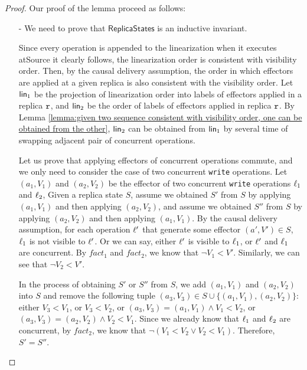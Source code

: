 \begin {proof}
Our proof of the lemma proceed as follows:

\begin{itemize}
\setlength{\itemsep}{0.5pt}
\item[-] We need to prove that $\mathsf{ReplicaStates}$ is an inductive invariant.

Since every operation is appended to the linearization when it executes atSource it clearly follows, the linearization order is consistent with visibility order. Then, by the causal delivery assumption, the order in which effectors are applied at a given replica is also consistent with the visibility order. Let $\mathsf{lin}_1$ be the projection of linearization order into labels of effectors applied in a replica $\mathtt{r}$, and $\mathsf{lin}_2$ be the order of labels of effectors applied in replica $\mathtt{r}$. By Lemma \ref{lemma:given two sequence consistent with visibility order, one can be obtained from the other}, $\mathsf{lin}_2$ can be obtained from $\mathsf{lin}_1$ by several time of swapping adjacent pair of concurrent operations.

Let us prove that applying effectors of concurrent operations commute, and we only need to consider the case of two concurrent {\tt write} operations. Let $(a_1,V_1)$ and $(a_2,V_2)$ be the effector of two concurrent {\tt write} operations $\ell_1$ and $\ell_2$, %
Given a replica state $S$, assume we obtained $S'$ from $S$ by applying $(a_1,V_1)$ and then applying $(a_2,V_2)$, and assume we obtained $S''$ from $S$ by applying $(a_2,V_2)$ and then applying $(a_1,V_1)$. By the causal delivery assumption, for each operation $\ell'$ that generate some effector $(a',V') \in S$, %
$\ell_1$ is not visible to $\ell'$. Or we can say, either $\ell'$ is visible to %
$\ell_1$, or $\ell'$ and %
$\ell_1$ are concurrent. By $fact_1$ and $fact_2$, we know that $\neg V_1 < V'$. Similarly, we can see that $\neg V_2 < V'$.

In the process of obtaining $S'$ or $S''$ from $S$, we add $(a_1,V_1)$ and $(a_2,V_2)$ into $S$ and remove the following tuple $(a_3,V_3) \in S \cup \{(a_1,V_1),(a_2,V_2)\}$: either $V_3 < V_1$, or $V_3 < V_2$, or $(a_3,V_3) = (a_1,V_1) \wedge V_1 < V_2$, or $(a_3,V_3) = (a_2,V_2) \wedge V_2 < V_1$. Since we already know that $\ell_1$ and $\ell_2$ are concurrent, by  $fact_2$, we know that $\neg (V_1 < V_2 \vee V_2 < V_1)$. Therefore, $S' = S''$.



\end{itemize}
\end{proof}
